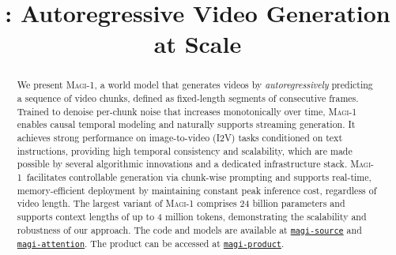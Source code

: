 \documentclass{article}
\title{\magi: Autoregressive Video Generation at Scale}
\newcommand{\magi}{\textsc{Magi-1}\xspace}
\begin{document}
\maketitle


\begin{abstract}
We present \magi, a world model that generates videos by \textit{autoregressively} predicting a sequence of video chunks, defined as fixed-length segments of consecutive frames. Trained to denoise per-chunk noise that increases monotonically over time, \magi enables causal temporal modeling and naturally supports streaming generation. It achieves strong performance on image-to-video (I2V) tasks conditioned on text instructions, providing high temporal consistency and scalability, which are made possible by several algorithmic innovations and a dedicated infrastructure stack. \magi\ facilitates controllable generation via chunk-wise prompting and supports real-time, memory-efficient deployment by maintaining constant peak inference cost, regardless of video length. The largest variant of \magi comprises 24 billion parameters and supports context lengths of up to 4 million tokens, demonstrating the scalability and robustness of our approach. The code and models are available at \href{https://github.com/SandAI-org/Magi-1}{\texttt{magi-source}} and \href{{https://github.com/SandAI-org/MagiAttention}}{\texttt{magi-attention}}. The product can be accessed at \href{https://sand.ai}{\texttt{magi-product}}.
\end{abstract}















\appendix

\end{document}

